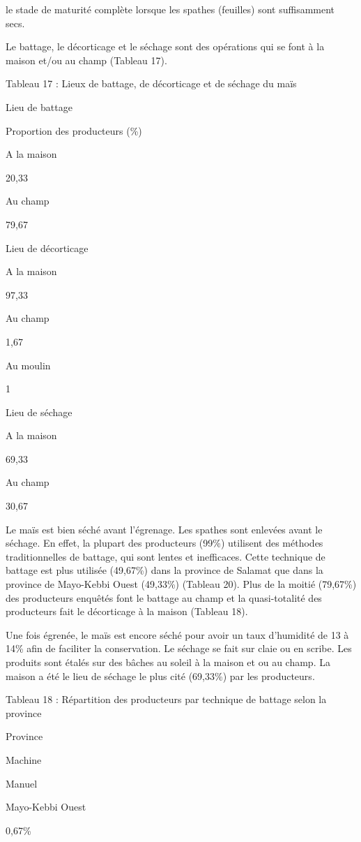 \documentclass[12pt,oneside]{report}
\begin{document}
le stade de maturité complète lorsque les spathes (feuilles) sont suffisamment secs.

Le battage, le décorticage et le séchage sont des opérations qui se font à la maison et/ou au champ (Tableau 17).

Tableau 17 : Lieux de battage, de décorticage et de séchage du maïs

Lieu de battage

Proportion des producteurs (\%)

A la maison

20,33

Au champ

79,67

Lieu de décorticage

A la maison

97,33

Au champ

1,67

Au moulin

1

Lieu de séchage

A la maison

69,33

Au champ

30,67

Le maïs est bien séché avant l’égrenage. Les spathes sont enlevées avant le séchage. En effet, la plupart des producteurs (99\%) utilisent des méthodes traditionnelles de battage, qui sont lentes et inefficaces. Cette technique de battage est plus utilisée (49,67\%) dans la province de Salamat que dans la province de Mayo-Kebbi Ouest (49,33\%) (Tableau 20). Plus de la moitié (79,67\%) des producteurs enquêtés font le battage au champ et la quasi-totalité des producteurs fait le décorticage à la maison (Tableau 18).

Une fois égrenée, le maïs est encore séché pour avoir un taux d’humidité de 13 à 14\% afin de faciliter la conservation. Le séchage se fait sur claie ou en scribe. Les produits sont étalés sur des bâches au soleil à la maison et ou au champ. La maison a été le lieu de séchage le plus cité (69,33\%) par les producteurs.

Tableau 18 : Répartition des producteurs par technique de battage selon la province

Province

Machine

Manuel

Mayo-Kebbi Ouest

0,67\%
\end{document}
